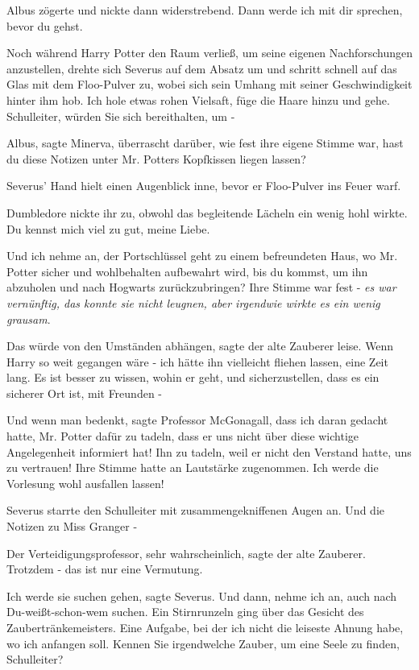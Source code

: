 Albus zögerte und nickte dann widerstrebend. \glqq{}Dann werde ich mit dir
sprechen, bevor du gehst.\grqq{}

Noch während Harry Potter den Raum verließ, um seine eigenen Nachforschungen
anzustellen, drehte sich Severus auf dem Absatz um und schritt schnell auf das
Glas mit dem Floo-Pulver zu, wobei sich sein Umhang mit seiner Geschwindigkeit
hinter ihm hob. \glqq{}Ich hole etwas rohen Vielsaft, füge die Haare hinzu und
gehe. Schulleiter, würden Sie sich bereithalten, um -\grqq{}

\glqq{}Albus\grqq{}, sagte Minerva, überrascht darüber, wie fest ihre eigene
Stimme war, \glqq{}hast du diese Notizen unter Mr. Potters Kopfkissen liegen
lassen?\grqq{}

Severus' Hand hielt einen Augenblick inne, bevor er Floo-Pulver ins Feuer warf.

Dumbledore nickte ihr zu, obwohl das begleitende Lächeln ein wenig hohl wirkte.
\glqq{}Du kennst mich viel zu gut, meine Liebe.\grqq{}

\glqq{}Und ich nehme an, der Portschlüssel geht zu einem befreundeten Haus, wo
Mr. Potter sicher und wohlbehalten aufbewahrt wird, bis du kommst, um ihn
abzuholen und nach Hogwarts zurückzubringen?\grqq{} Ihre Stimme war fest -
\emph{es war vernünftig, das konnte sie nicht leugnen, aber irgendwie wirkte es
ein wenig grausam}.

\glqq{}Das würde von den Umständen abhängen\grqq{}, sagte der alte Zauberer
leise. \glqq{}Wenn Harry so weit gegangen wäre - ich hätte ihn vielleicht fliehen
lassen, eine Zeit lang. Es ist besser zu wissen, wohin er geht, und
sicherzustellen, dass es ein sicherer Ort ist, mit Freunden -\grqq{}

\glqq{}Und wenn man bedenkt\grqq{}, sagte Professor McGonagall, \glqq{}dass ich
daran gedacht hatte, Mr. Potter dafür zu tadeln, dass er uns nicht über diese
wichtige Angelegenheit informiert hat! Ihn zu tadeln, weil er nicht den Verstand
hatte, uns zu vertrauen!\grqq{} Ihre Stimme hatte an Lautstärke zugenommen.
\glqq{}Ich werde die Vorlesung wohl ausfallen lassen!\grqq{}

Severus starrte den Schulleiter mit zusammengekniffenen Augen an. \glqq{}Und die
Notizen zu Miss Granger -\grqq{}

\glqq{}Der Verteidigungsprofessor, sehr wahrscheinlich\grqq{}, sagte der alte
Zauberer. \glqq{}Trotzdem - das ist nur eine Vermutung.\grqq{}

\glqq{}Ich werde sie suchen gehen\grqq{}, sagte Severus. \glqq{}Und dann, nehme
ich an, auch nach Du-weißt-schon-wem suchen.\grqq{} Ein Stirnrunzeln ging über
das Gesicht des Zaubertränkemeisters. \glqq{}Eine Aufgabe, bei der ich nicht die
leiseste Ahnung habe, wo ich anfangen soll. Kennen Sie irgendwelche Zauber, um
eine Seele zu finden, Schulleiter?\grqq{}

